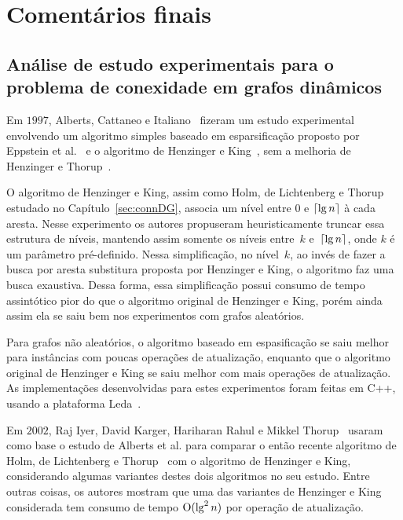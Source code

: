 \chapter{Comentários finais}
\label{sec:conclusao}

\section{Análise de estudo experimentais para o problema de conexidade em grafos dinâmicos}
\label{sec:conclusao:xp}

Em $1997$, Alberts, Cattaneo e Italiano~\cite{EmpiricalStudy1997} fizeram um estudo experimental envolvendo um algoritmo simples baseado em esparsificação proposto por Eppstein et al.~\cite{Eppstein1992SparsificationaTF} e o algoritmo de Henzinger e King~\cite{HenzingerKing}, sem a melhoria de Henzinger e Thorup~\cite{HenzingerThorup}.


O algoritmo de Henzinger e King, assim como Holm, de Lichtenberg e Thorup~\cite{poly_log} estudado no Capítulo~\ref{sec:connDG}, associa um nível entre $0$ e $\lceil{\lg n}\rceil$ à cada aresta.
Nesse experimento os autores propuseram heuristicamente truncar essa estrutura de níveis, mantendo assim somente os níveis entre~$k$ e~$\lceil{\lg n}\rceil$, onde $k$ é um parâmetro pré-definido.
Nessa simplificação, no nível~$k$, ao invés de fazer a busca por aresta substitura proposta por Henzinger e King, o algoritmo faz uma busca exaustiva. Dessa forma, essa simplificação possui consumo de tempo assintótico pior do que o algoritmo original de Henzinger e King, porém ainda assim ela se saiu bem nos experimentos com grafos aleatórios.

Para grafos não aleatórios, o algoritmo baseado em espasificação se saiu melhor para instâncias com poucas operações de atualização, enquanto que o algoritmo original de Henzinger e King se saiu melhor com mais operações de atualização.
As implementações desenvolvidas para estes experimentos foram feitas em C++, usando a plataforma Leda~\cite{LEDA}.

Em $2002$, Raj Iyer, David Karger, Hariharan Rahul e Mikkel Thorup~\cite{EmpiricalStudy2002} usaram como base o estudo de Alberts et al. para comparar o então recente algoritmo de Holm, de Lichtenberg e Thorup~\cite{poly_log} com o algoritmo de Henzinger e King, considerando algumas variantes destes dois algoritmos no seu estudo.
Entre outras coisas, os autores mostram que uma das variantes de Henzinger e King considerada tem consumo de tempo $\mathrm{O}(\lg^2 n)$ por operação de atualização.

